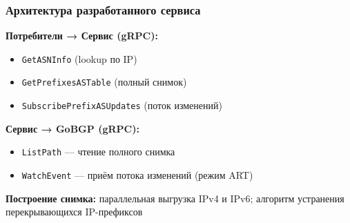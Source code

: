 \begin{frame}[fragile]\frametitle{Архитектура разработанного сервиса}
\centering
{}

\vspace{0.3em}
\raggedright
\textbf{Потребители → Сервис (gRPC):}
\begin{itemize}\setlength{\itemsep}{0.05em}
  \item \texttt{GetASNInfo} (lookup по IP)
  \item \texttt{GetPrefixesASTable} (полный снимок)
  \item \texttt{SubscribePrefixASUpdates} (поток изменений)
\end{itemize}
\textbf{Сервис → GoBGP (gRPC):}
\begin{itemize}\setlength{\itemsep}{0.05em}
  \item \texttt{ListPath} --- чтение полного снимка
  \item \texttt{WatchEvent} --- приём потока изменений (режим ART)
\end{itemize}
\textbf{Построение снимка:} параллельная выгрузка IPv4 и IPv6; алгоритм устранения перекрывающихся IP-префиксов
\end{frame}
